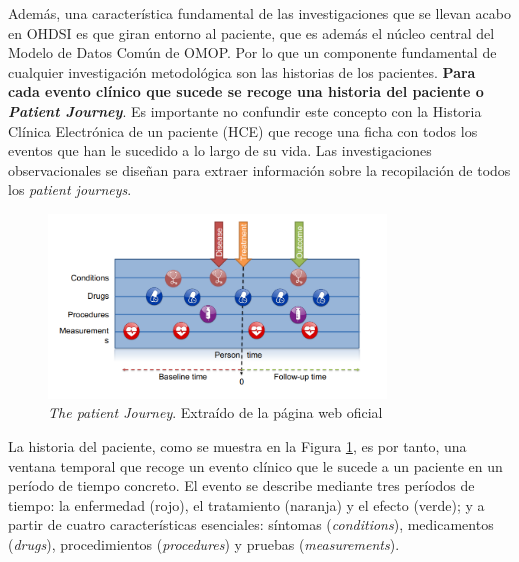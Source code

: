 
Además, una característica fundamental de las investigaciones que se llevan acabo en OHDSI es que giran entorno al paciente, que es además el núcleo central del Modelo de Datos Común de OMOP. Por lo que un componente fundamental de cualquier investigación metodológica son las historias de los pacientes. \textbf{Para cada evento clínico que sucede se recoge una historia del paciente o \textit{Patient Journey}}. Es importante no confundir este concepto con la Historia Clínica Electrónica de un paciente (HCE) que recoge una ficha con todos los eventos que han le sucedido a lo largo de su vida. Las investigaciones observacionales se diseñan para extraer información sobre la recopilación de todos los \textit{patient journeys}.

\begin{figure}[H]
    \centering
    \includegraphics[width=0.80\textwidth]{figures/patientJourney.png}
     \caption{\textit{The patient Journey}. Extraído de la página web oficial \cite{OHDSIbook}}
    \label{fig:patientJourney}
\end{figure}

La historia del paciente,  como se muestra en la Figura \ref{fig:patientJourney}, es por tanto, una ventana temporal que recoge un evento clínico que le sucede a un paciente en un período de tiempo concreto. El evento se describe mediante tres períodos de tiempo: la enfermedad (rojo), el tratamiento (naranja) y el efecto (verde); y a partir de cuatro características esenciales: síntomas (\textit{conditions}), medicamentos (\textit{drugs}), procedimientos (\textit{procedures}) y pruebas (\textit{measurements}).

